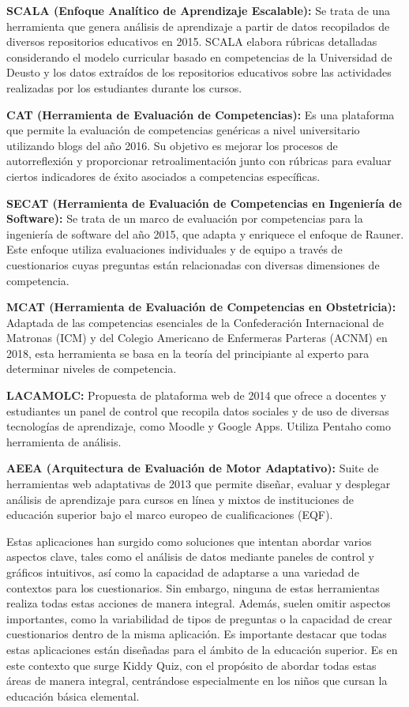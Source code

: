 \textbf{SCALA (Enfoque Analítico de Aprendizaje Escalable):} Se trata de una herramienta que genera análisis de aprendizaje a partir de datos recopilados de diversos repositorios educativos en 2015. SCALA elabora rúbricas detalladas considerando el modelo curricular basado en competencias de la Universidad de Deusto y los datos extraídos de los repositorios educativos sobre las actividades realizadas por los estudiantes durante los cursos.

\textbf{CAT (Herramienta de Evaluación de Competencias):} Es una plataforma que permite la evaluación de competencias genéricas a nivel universitario utilizando blogs del año 2016. Su objetivo es mejorar los procesos de autorreflexión y proporcionar retroalimentación junto con rúbricas para evaluar ciertos indicadores de éxito asociados a competencias específicas.

\textbf{SECAT (Herramienta de Evaluación de Competencias en Ingeniería de Software):} Se trata de un marco de evaluación por competencias para la ingeniería de software del año 2015, que adapta y enriquece el enfoque de Rauner. Este enfoque utiliza evaluaciones individuales y de equipo a través de cuestionarios cuyas preguntas están relacionadas con diversas dimensiones de competencia.

\textbf{MCAT (Herramienta de Evaluación de Competencias en Obstetricia):} Adaptada de las competencias esenciales de la Confederación Internacional de Matronas (ICM) y del Colegio Americano de Enfermeras Parteras (ACNM) en 2018, esta herramienta se basa en la teoría del principiante al experto para determinar niveles de competencia.

\textbf{LACAMOLC:} Propuesta de plataforma web de 2014 que ofrece a docentes y estudiantes un panel de control que recopila datos sociales y de uso de diversas tecnologías de aprendizaje, como Moodle y Google Apps. Utiliza Pentaho como herramienta de análisis.

\textbf{AEEA (Arquitectura de Evaluación de Motor Adaptativo):} Suite de herramientas web adaptativas de 2013 que permite diseñar, evaluar y desplegar análisis de aprendizaje para cursos en línea y mixtos de instituciones de educación superior bajo el marco europeo de cualificaciones (EQF).

Estas aplicaciones han surgido como soluciones que intentan abordar varios aspectos clave, tales como el análisis de datos mediante paneles de control y gráficos intuitivos, así como la capacidad de adaptarse a una variedad de contextos para los cuestionarios. Sin embargo, ninguna de estas herramientas realiza todas estas acciones de manera integral. Además, suelen omitir aspectos importantes, como la variabilidad de tipos de preguntas o la capacidad de crear cuestionarios dentro de la misma aplicación. Es importante destacar que todas estas aplicaciones están diseñadas para el ámbito de la educación superior. Es en este contexto que surge Kiddy Quiz, con el propósito de abordar todas estas áreas de manera integral, centrándose especialmente en los niños que cursan la educación básica elemental.
